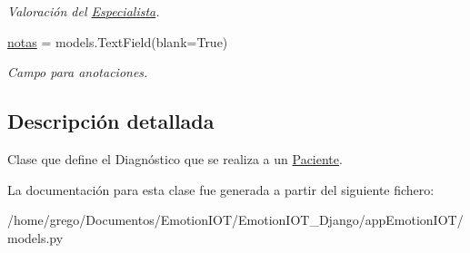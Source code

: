 \begin{DoxyCompactItemize}
\begin{DoxyCompactList}\small\item\em Valoración del \hyperlink{classappEmotionIOT_1_1models_1_1Especialista}{Especialista}. \end{DoxyCompactList}\item 
\hyperlink{classappEmotionIOT_1_1models_1_1Diagnostico_ab444a9aa455ca70a785db8a102095ec0}{notas} = models.\+Text\+Field(blank=True)\hypertarget{classappEmotionIOT_1_1models_1_1Diagnostico_ab444a9aa455ca70a785db8a102095ec0}{}\label{classappEmotionIOT_1_1models_1_1Diagnostico_ab444a9aa455ca70a785db8a102095ec0}

\begin{DoxyCompactList}\small\item\em Campo para anotaciones. \end{DoxyCompactList}\end{DoxyCompactItemize}


\subsection{Descripción detallada}
Clase que define el Diagnóstico que se realiza a un \hyperlink{classappEmotionIOT_1_1models_1_1Paciente}{Paciente}. 

La documentación para esta clase fue generada a partir del siguiente fichero\+:\begin{DoxyCompactItemize}
\item 
/home/grego/\+Documentos/\+Emotion\+I\+O\+T/\+Emotion\+I\+O\+T\+\_\+\+Django/app\+Emotion\+I\+O\+T/models.\+py\end{DoxyCompactItemize}
